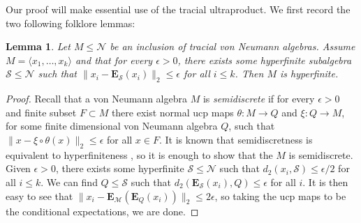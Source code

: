 \documentclass[11pt]{amsart}
\newcommand{\cN}{{\mathcal{N}}}
\newcommand{\bE}{{\mathbf{E}}}
\newtheorem{lemma}[theorem]{Lemma}
\theoremstyle{definition}
\theoremstyle{remark}
\theoremstyle{definition}
\begin{document}
Our proof will make essential use of the tracial ultraproduct.
We first record the two following folklore lemmas:

\begin{lemma}\label{lem:almost_hyperfinite_is_hyperfinite}
    Let $M \leq \cN$ be an inclusion of tracial von Neumann algebras. Assume $M = \langle x_1, \dots, x_k \rangle$ and that for every $\epsilon >0$, there exists some hyperfinite subalgebra $\mathcal S \leq \cN$ such that $\| x_i - \bE _\mathcal S(x_i) \|_2 \leq \epsilon$ for all $i \leq k$. Then $M$ is hyperfinite.
\end{lemma}
\begin{proof}
    Recall that a von Neumann algebra $M$ is \emph{semidiscrete} if for every $\epsilon >0$ and finite subset $F \subset M$ there exist normal ucp maps $\theta: M \to Q$ and $\xi: Q \to M$, for some finite dimensional von Neumann algebra $Q$, such that $\| x - \xi \circ \theta (x) \|_2 \leq \epsilon$ for all $x \in F$.
    It is known  that semidiscretness is equivalent to hyperfiniteness \cite{Connes}, so it is enough to show that the $M$ is semidiscrete.
    Given $\epsilon>0$, there exists some hyperfinite $\mathcal S \leq \cN$ such that $d_2(x_i, \mathcal S) \leq \epsilon/2$ for all $i \leq k$. 
    We can find $Q \leq \mathcal S$ such that $d_2(\bE_\mathcal S(x_i),  Q) \leq \epsilon $  for all $i$. It is then easy to see that $\| x_i - \bE_\mathcal M (\bE_Q(x_i))\|_2 \leq 2\epsilon$, so taking the ucp maps to be the conditional expectations, we are done.
\end{proof}
\end{document}
